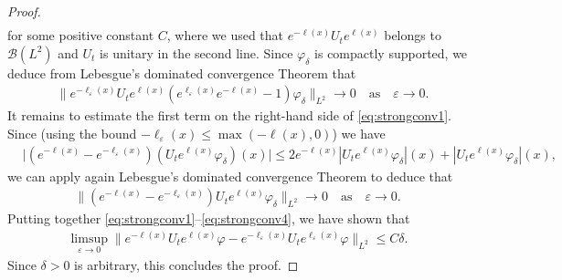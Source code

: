 \documentclass[10pt,a4paper]{amsart}
\begin{document}
\begin{proof}
\begin{align*}
\end{align*}
for some positive constant $C$, where we used that $e^{-\ell(x)}U_te^{\ell(x)}$ belongs to $\mathcal{B}(L^2)$ and $U_t$ is unitary in the second line. Since $\varphi_\delta$ is compactly supported, we deduce from Lebesgue's dominated convergence Theorem that
\begin{align}
   & \big\|e^{-\ell_\varepsilon(x)}U_te^{\ell(x)}(e^{\ell_\varepsilon(x)}e^{-\ell(x)}-1)\varphi_\delta\big\|_{L^2}\to 0 \quad\text{as}\quad  \varepsilon\to0.\label{eq:strongconv3}
\end{align}
It remains to estimate the first term on the right-hand side of \eqref{eq:strongconv1}. Since (using the bound $-\ell_\varepsilon(x)\le\max(-\ell(x),0)$) we have
\begin{align*}
    &\big|(e^{-\ell(x)}-e^{-\ell_\varepsilon(x)})(U_te^{\ell(x)}\varphi_\delta)(x)\big|\le2e^{-\ell(x)}|U_te^{\ell(x)}\varphi_\delta|(x)+|U_te^{\ell(x)}\varphi_\delta|(x),
\end{align*}
we can apply again Lebesgue's dominated convergence Theorem to deduce that
\begin{align}
    \big\|(e^{-\ell(x)}-e^{-\ell_\varepsilon(x)})U_te^{\ell(x)}\varphi_\delta\big\|_{L^2}\to0 \quad\text{as}\quad \varepsilon\to0.\label{eq:strongconv4}
\end{align}
Putting together \eqref{eq:strongconv1}--\eqref{eq:strongconv4}, we have shown that
\begin{align*}
   \limsup_{\varepsilon\to0} \big\|e^{-\ell(x)}U_te^{\ell(x)}\varphi-e^{-\ell_\varepsilon(x)}U_te^{\ell_\varepsilon(x)}\varphi\big\|_{L^2}\le C\delta.
\end{align*}
Since $\delta>0$ is arbitrary, this concludes the proof.
	\end{proof}
\end{document}
